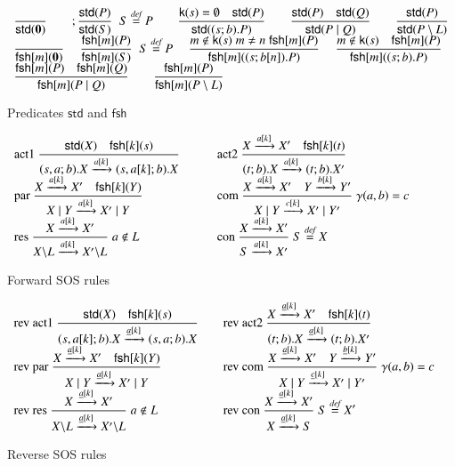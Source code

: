 \documentclass[preprint,12pt]{elsarticle}
\newcommand{\paral}{\; \vert \;}
\newcommand{\Rule}[2]{\displaystyle{\frac{#1}{#2}}}
\newcommand{\rom}[1]{\mbox{\rm{#1}}}
\newcommand{\Nil}{\mathbf{0}}
\newcommand{\std}[1]{\mathsf{std}(#1)}
\newcommand{\kkey}[1]{\mathsf{k}(#1)}
\newcommand{\fresh}[2]{\mathsf{fsh}[#1](#2)}
\newcommand{\bydef}{\stackrel{\emph{def}}{=}}
\begin{document}
\renewcommand{\arraystretch}{3}
\begin{figure}[t]
\[
\begin{array}{l}
\Rule
{}
{\std{\Nil}}
\qquad; 
\Rule
{\std{P}}
{\std{S}}
\;\;
S \bydef P
\qquad 
\Rule   
{\kkey{s}=\emptyset \quad  \std{P}}
{\std{(s;b).P}}
\qquad 
\Rule   
{\std{P} \quad \std{Q}}
{\std{P \paral Q}}
\qquad
\Rule   
{\std{P}}
{\std{P \setminus L}}
\\%
\Rule
{}
{\fresh{m}{\Nil}}
\quad \;
\Rule
{\fresh{m}{P}}
{\fresh{m}{S}}
\;\;
S \bydef P
\quad\; 
\Rule
{m \notin \kkey{s} \; m \neq n \; \fresh{m}{P}}
{\fresh{m}{(s;b[n]).P}}
\quad \;
\Rule
{m \notin \kkey{s} \quad \fresh{m}{P}}
{\fresh{m}{(s;b).P}}
\\%
\Rule
{\fresh{m}{P} \quad \fresh{m}{Q}}
{\fresh{m}{P \paral Q}}
\qquad
\Rule
{\fresh{m}{P}}
{\fresh{m}{P \setminus L}}
\end{array}
\]
\caption{Predicates $\mathsf{std}$ and $\mathsf{fsh}$} \label{fig:predicates}
\end{figure}

\begin{figure}[t] 
\[
\begin{array}{ll}
\rom{act1}\ 
\Rule
{\std{X} \quad \fresh{k}{s}}
{(s,a;b).X \xrightarrow{a[k]}(s,a[k];b).X}
\qquad &
\rom{act2}\
\Rule
{X \xrightarrow{a[k]} X' \quad \fresh{k}{t}}
{(t;b).X \xrightarrow{a[k]} (t;b).X'}
\\
\rom{par}\
\Rule
{X \xrightarrow{a[k]} X'\quad \fresh{k}{Y}}
{X \paral Y \xrightarrow{a[k]} X' \paral Y}
\qquad &
\rom{com}\
\Rule
{X \xrightarrow{a[k]} X' \quad Y \xrightarrow{b[k]} Y'}
{X \paral Y \xrightarrow{c[k]} X' \paral Y'}
\; \gamma(a,b)=c
%
\\
\rom{res}\
\Rule
{X \xrightarrow{a[k]} X'}
{X\backslash L \xrightarrow{a[k]} X'\backslash L}
\; a \notin L
\qquad &
\rom{con}\
\Rule
{X \xrightarrow{a[k]} X'}
{S \xrightarrow{a[k]} X'}
\; S \bydef X
\end{array}
\] 
\caption{Forward SOS rules} \label{fig:fsos}
\end{figure}

\begin{figure}[t]
\[
\begin{array}{ll}
\rom{rev act1}\
\Rule
{\std{X} \quad \fresh{k}{s}}
{(s,a[k];b).X \xrightarrow{\underline{a}[k]}(s,a;b).X}
\quad &
\rom{rev act2}\
\Rule
{X \xrightarrow{\underline{a}[k]} X' \quad \fresh{k}{t}}
{(t;b).X \xrightarrow{\underline{a}[k]} (t;b).X'}
\\
\rom{rev par}\
\Rule
{X \xrightarrow{\underline{a}[k]} X'\quad \fresh{k}{Y}}
{X \paral Y \xrightarrow{\underline{a}[k]} X' \paral Y}
\qquad &
\rom{rev com}\
\Rule
{X \xrightarrow{\underline{a}[k]} X' \quad Y \xrightarrow{\underline{b}[k]} Y'}
{X \paral Y \xrightarrow{\underline{c}[k]} X' \paral Y'}
\; \gamma(a,b)=c
%
\\
\rom{rev res}\
\Rule
{X \xrightarrow{\underline{a}[k]} X'}
{X\backslash L \xrightarrow{\underline{a}[k]} X'\backslash L}
\; a \notin L
\qquad &
\rom{rev con}\
\Rule
{X \xrightarrow{\underline{a}[k]} X'}
{X \xrightarrow{\underline{a}[k]} S}
\; S \bydef X'
\end{array}
\]
\caption{Reverse SOS rules } \label{fig:reversesos}
\end{figure}
\end{document}
